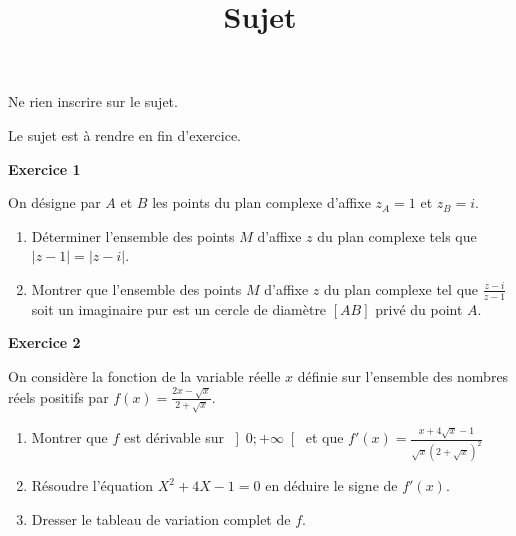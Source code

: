 \documentclass[12pt,a4paper,french]{article}
\author{}
\title{Sujet \no{3}}
\date{}
\begin{document}
\maketitle
\begin{center}Ne rien inscrire sur le sujet.

  Le sujet est à rendre en fin d'exercice.
\end{center}

\bigskip

\textbf{Exercice 1}

On désigne par $A$ et $B$ les points du plan complexe d'affixe $z_A = 1$
et $z_B = i$.
\begin{enumerate}
  \item Déterminer l'ensemble des points $M$ d'affixe $z$ du plan
    complexe tels que $\left\lvert z - 1 \right\rvert = \left\lvert z -
    i \right\rvert$.
  \item Montrer que l'ensemble des points $M$ d'affixe $z$ du plan
    complexe tel que $\frac{z - i}{z -1}$ soit un imaginaire pur est un
    cercle de diamètre $[AB]$ privé du point $A$.
\end{enumerate}

\medskip

\textbf{Exercice 2}

On considère la fonction de la variable réelle $x$ définie sur
l'ensemble des nombres réels positifs par $f(x) = \frac{2x - \sqrt{x}}{2
+ \sqrt{x}}$.

\begin{enumerate}
  \item Montrer que $f$ est dérivable sur $\left]0 ; +\infty\right[$ et
    que $f'(x) = \frac{ x + 4\sqrt{x} - 1}{\sqrt{x}(2 + \sqrt{x})^2}$
  \item Résoudre l'équation $X^2 + 4X - 1 =0$ en déduire le signe de
    $f'(x)$.
  \item Dresser le tableau de variation complet de $f$.
\end{enumerate}
\end{document}
